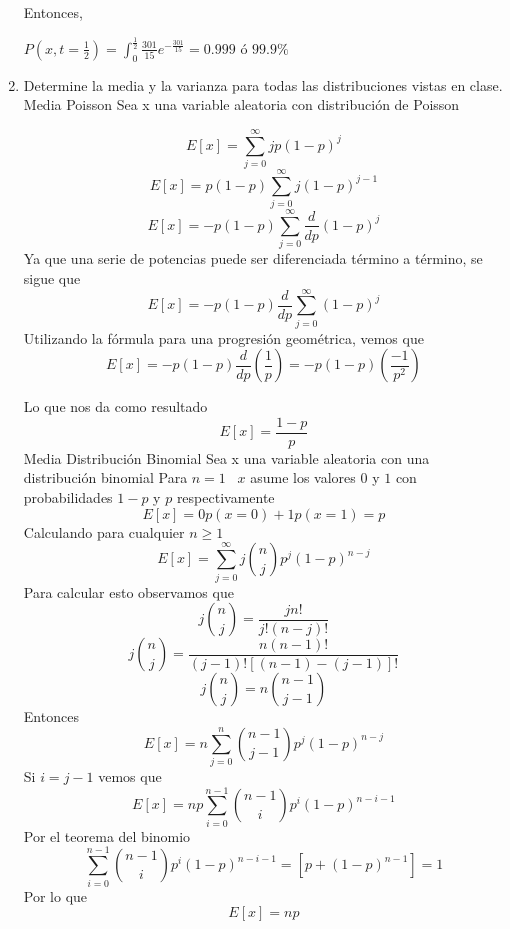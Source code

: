 \begin{enumerate}
    Entonces, 
    \begin{center}
        $ P(x,t = \frac{1}{2}) = \int_{0}^{\frac{1}{2}} \frac{301}{15}e^{-\frac{301}{15}} = 0.999 $ ó $99.9\% $
    \end{center}
    \item Determine la media y la varianza para todas las distribuciones vistas en clase.
    Media Poisson 
    Sea x una variable aleatoria con distribución de Poisson
    \begin{center}
        $$E[x] = \sum_{j = 0}^\infty jp(1 - p)^{j}$$
        $$E[x] = p(1 - p)\sum_{j = 0}^\infty j(1 - p)^{j - 1}$$
        $$E[x] = -p(1 - p)\sum_{j = 0}^\infty \dfrac{d}{dp}(1 - p)^{j}$$
        Ya que una serie de potencias puede ser diferenciada término a término, se sigue que
        $$E[x] = -p(1 - p)\dfrac{d}{dp}\sum_{j = 0}^\infty (1 - p)^{j}$$
        Utilizando la fórmula para una progresión geométrica, vemos que
        $$E[x] = -p(1 - p)\dfrac{d}{dp}\left(\dfrac{1}{p}\right) = -p(1 - p)\left(\dfrac{-1}{p^{2}}\right)$$
    \end{center}
        Lo que nos da como resultado
        $$E[x] = \dfrac{1 - p}{p}$$
        Media Distribución Binomial
        Sea x una variable aleatoria con una distribución binomial
        Para $n = 1 \;\;\; x$ asume los valores $0$ y $1$ con probabilidades $1 - p$ y $p$ respectivamente
        $$E[x] = 0p(x = 0) + 1p(x = 1) = p$$
        Calculando para cualquier $n \geq 1$ 
        $$E[x] = \sum_{j = 0}^\infty j\binom{n}{j}p^{j}(1 - p)^{n - j}$$
        Para calcular esto observamos que
        $$j\binom{n}{j} = \dfrac{jn!}{j!(n - j)!}$$
        $$j\binom{n}{j} = \dfrac{n(n - 1)!}{(j - 1)![(n - 1)- (j - 1)]!}$$
        $$j\binom{n}{j} = n\binom{n - 1}{j - 1}$$
        Entonces
        $$E[x] = n\sum_{j = 0}^n \binom{n - 1}{j - 1}p^{j}(1 - p)^{n - j}$$
        Si $i = j - 1$ vemos que
        $$E[x] = np\sum_{i = 0}^{n - 1} \binom{n - 1}{i}p^{i}(1 - p)^{n - i - 1}$$
        Por el teorema del binomio
        $$\sum_{i = 0}^{n - 1} \binom{n - 1}{i}p^{i}(1 - p)^{n - i - 1} = [p + (1 - p)^{n - 1}] = 1$$
        Por lo que 
        $$E[x] = np$$
\end{enumerate}
